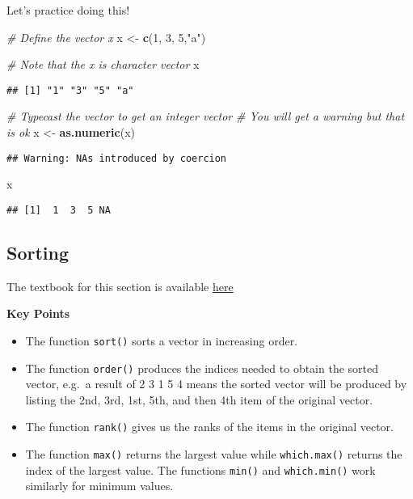 \documentclass[
]{article}
\newenvironment{Shaded}{\begin{snugshade}}{\end{snugshade}}
\newcommand{\CommentTok}[1]{\textcolor[rgb]{0.56,0.35,0.01}{\textit{#1}}}
\newcommand{\DecValTok}[1]{\textcolor[rgb]{0.00,0.00,0.81}{#1}}
\newcommand{\KeywordTok}[1]{\textcolor[rgb]{0.13,0.29,0.53}{\textbf{#1}}}
\newcommand{\NormalTok}[1]{#1}
\newcommand{\StringTok}[1]{\textcolor[rgb]{0.31,0.60,0.02}{#1}}
\providecommand{\tightlist}{%
  \setlength{\itemsep}{0pt}\setlength{\parskip}{0pt}}
\begin{document}
Let's practice doing this!

\begin{Shaded}
\begin{Highlighting}[]
\CommentTok{# Define the vector x}
\NormalTok{x <-}\StringTok{ }\KeywordTok{c}\NormalTok{(}\DecValTok{1}\NormalTok{, }\DecValTok{3}\NormalTok{, }\DecValTok{5}\NormalTok{,}\StringTok{"a"}\NormalTok{)}

\CommentTok{# Note that the x is character vector}
\NormalTok{x}
\end{Highlighting}
\end{Shaded}

\begin{verbatim}
## [1] "1" "3" "5" "a"
\end{verbatim}

\begin{Shaded}
\begin{Highlighting}[]
\CommentTok{# Typecast the vector to get an integer vector}
\CommentTok{# You will get a warning but that is ok}
\NormalTok{x <-}\StringTok{ }\KeywordTok{as.numeric}\NormalTok{(x)}
\end{Highlighting}
\end{Shaded}

\begin{verbatim}
## Warning: NAs introduced by coercion
\end{verbatim}

\begin{Shaded}
\begin{Highlighting}[]
\NormalTok{x}
\end{Highlighting}
\end{Shaded}

\begin{verbatim}
## [1]  1  3  5 NA
\end{verbatim}

\hypertarget{sorting}{%
\subsection{Sorting}\label{sorting}}

The textbook for this section is available
\href{https://rafalab.github.io/dsbook/r-basics.html\#sorting}{here}

\textbf{Key Points}

\begin{itemize}
\tightlist
\item
  The function \texttt{sort()} sorts a vector in increasing order.
\item
  The function \texttt{order()} produces the indices needed to obtain
  the sorted vector, e.g.~a result of 2 3 1 5 4 means the sorted vector
  will be produced by listing the 2nd, 3rd, 1st, 5th, and then 4th item
  of the original vector.
\item
  The function \texttt{rank()} gives us the ranks of the items in the
  original vector.
\item
  The function \texttt{max()} returns the largest value while
  \texttt{which.max()} returns the index of the largest value. The
  functions \texttt{min()} and \texttt{which.min()} work similarly for
  minimum values.
\end{itemize}
\end{document}
